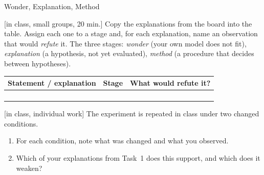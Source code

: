 \begin{uebungsblatt}{Wonder, Explanation, Method}

[in class, small groups, 20 min.]
Copy the explanations from the board into the table. Assign each one to a
stage and, for each explanation, name an observation that would
\emph{refute} it. The three stages: \emph{wonder} (your own model does not
fit), \emph{explanation} (a hypothesis, not yet evaluated), \emph{method}
(a procedure that decides between hypotheses).

\begin{center}
\renewcommand{\arraystretch}{2.2}
\begin{tabular}{|p{}|p{}|p{}|}
\hline
\textbf{Statement / explanation} & \textbf{Stage} & \textbf{What would refute it?} \\
\hline
 & & \\ \hline
 & & \\ \hline
 & & \\ \hline
 & & \\ \hline
\end{tabular}
\end{center}

[in class, individual work]
The experiment is repeated in class under two changed conditions.
\begin{enumerate}
  \item For each condition, note what was changed and what you observed.
  \item Which of your explanations from Task~1 does this support, and which
    does it weaken?
\end{enumerate}
\end{uebungsblatt}

